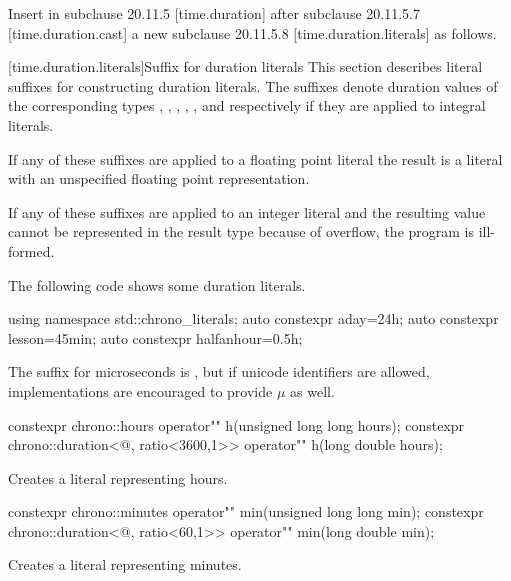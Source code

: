 \documentclass[ebook,11pt,article]{memoir}
\begin{document}
Insert in subclause 20.11.5 [time.duration] after subclause 20.11.5.7 [time.duration.cast] a new subclause 20.11.5.8 [time.duration.literals] as follows.

[time.duration.literals]{Suffix for duration literals}
\pnum
This section describes literal suffixes for constructing duration literals. The suffixes  denote duration values of the corresponding types , , , , , and  respectively if they are applied to integral literals. 

\pnum
If any of these suffixes are applied to a floating point literal the result is a  literal with an unspecified floating point representation.

\pnum
If any of these suffixes are applied to an integer literal and the resulting  value cannot be represented in the result type because of overflow, the program is ill-formed.

\pnum
\enterexample 
The following code shows some duration literals.
\begin{codeblock}
{
    using namespace std::chrono_literals;
    auto constexpr aday=24h; 
    auto constexpr lesson=45min; 
    auto constexpr halfanhour=0.5h;
}
\end{codeblock}
\exitexample

\pnum
\enternote
The suffix for microseconds is , but if unicode identifiers are allowed, implementations are encouraged to provide $\mu{}$ as well.
\exitnote

\begin{itemdecl}
constexpr 
chrono::hours operator"" h(unsigned long long hours);
constexpr 
chrono::duration<@\unspec@, ratio<3600,1>> operator"" h(long double hours);
\end{itemdecl}

\begin{itemdescr}
\pnum
\effects
Creates a  literal representing  hours. 
\end{itemdescr}

\begin{itemdecl}
constexpr 
chrono::minutes operator"" min(unsigned long long min);
constexpr 
chrono::duration<@\unspec@, ratio<60,1>> operator"" min(long double min);
\end{itemdecl}

\begin{itemdescr}
\pnum
\effects
Creates a  literal representing  minutes. 
\end{itemdescr}
\end{document}

